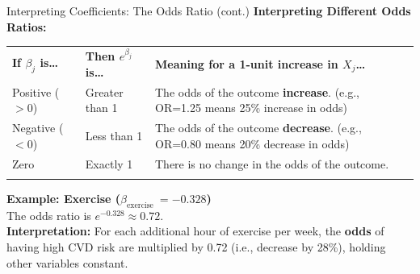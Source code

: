 \documentclass[aspectratio=169,ignorenonframetext]{beamer}
\begin{document}
\begin{frame}{Interpreting Coefficients: The Odds Ratio (cont.)}
\textbf{Interpreting Different Odds Ratios:}

{\def\LTcaptype{none} %
\begin{longtable}[]{@{}
  >{\centering\arraybackslash}p{}
  >{\centering\arraybackslash}p{}
  >{\raggedright\arraybackslash}p{}@{}}
\toprule\noalign{}
\endhead
\textbf{If \(\beta_{j}\) is\ldots{}} & \textbf{Then \(e^{\beta_{j}}\)
is\ldots{}} & \textbf{Meaning for a 1-unit increase in
\(X_{j}\)\ldots{}} \\
Positive (\(> 0\)) & Greater than 1 & The odds of the outcome
\textbf{increase}. (e.g., OR=1.25 means 25\% increase in odds) \\
Negative (\(< 0\)) & Less than 1 & The odds of the outcome
\textbf{decrease}. (e.g., OR=0.80 means 20\% decrease in odds) \\
Zero & Exactly 1 & There is no change in the odds of the outcome. \\
\bottomrule\noalign{}
\end{longtable}
}

\textbf{Example: Exercise (\(\beta_{\text{exercise }} = - 0.328\))}\\
The odds ratio is \(e^{- 0.328} \approx 0.72\).\\
\textbf{Interpretation:} For each additional hour of exercise per week,
the \textbf{odds} of having high CVD risk are multiplied by 0.72 (i.e.,
decrease by 28\%), holding other variables constant.
\end{frame}
\end{document}
